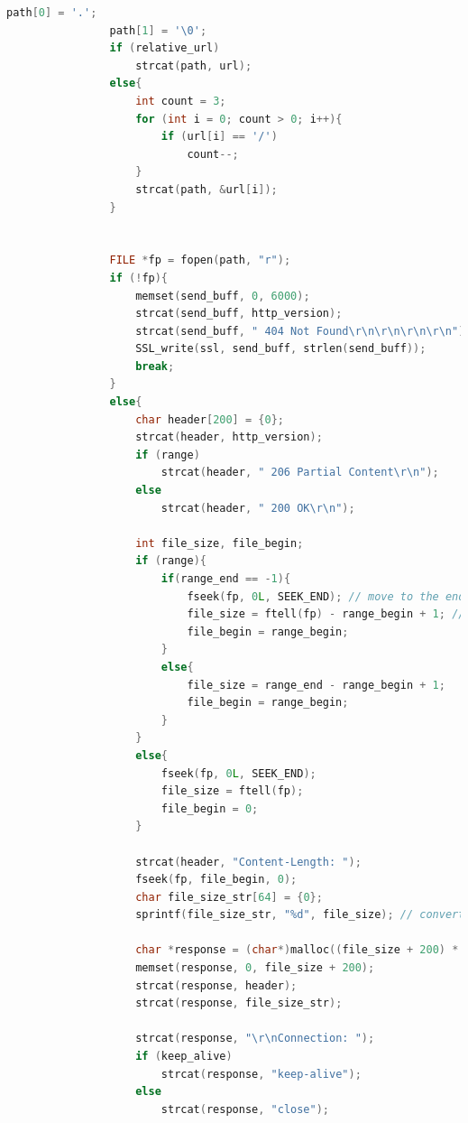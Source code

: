 \documentclass[UTF8]{article}
\begin{document}
\begin{lstlisting}[language=c]
                path[0] = '.';
                path[1] = '\0';
                if (relative_url)
                    strcat(path, url);
                else{
                    int count = 3;
                    for (int i = 0; count > 0; i++){
                        if (url[i] == '/')
                            count--;
                    }
                    strcat(path, &url[i]);
                }
    
    
                FILE *fp = fopen(path, "r");
                if (!fp){
                    memset(send_buff, 0, 6000);
                    strcat(send_buff, http_version);
                    strcat(send_buff, " 404 Not Found\r\n\r\n\r\n\r\n");
                    SSL_write(ssl, send_buff, strlen(send_buff));
                    break;
                }
                else{
                    char header[200] = {0};
                    strcat(header, http_version);
                    if (range)
                        strcat(header, " 206 Partial Content\r\n");
                    else
                        strcat(header, " 200 OK\r\n");
    
                    int file_size, file_begin;
                    if (range){
                        if(range_end == -1){
                            fseek(fp, 0L, SEEK_END); // move to the end of file
                            file_size = ftell(fp) - range_begin + 1; // calculate the size of file
                            file_begin = range_begin;
                        }
                        else{
                            file_size = range_end - range_begin + 1;
                            file_begin = range_begin;
                        }
                    }
                    else{
                        fseek(fp, 0L, SEEK_END);
                        file_size = ftell(fp);
                        file_begin = 0;
                    }
    
                    strcat(header, "Content-Length: ");
                    fseek(fp, file_begin, 0);
                    char file_size_str[64] = {0};
                    sprintf(file_size_str, "%d", file_size); // convert file size to string
    
                    char *response = (char*)malloc((file_size + 200) * sizeof(char));
                    memset(response, 0, file_size + 200);
                    strcat(response, header);
                    strcat(response, file_size_str);
    
                    strcat(response, "\r\nConnection: ");
                    if (keep_alive)
                        strcat(response, "keep-alive");
                    else
                        strcat(response, "close");
                    

\end{lstlisting}
\end{document}
